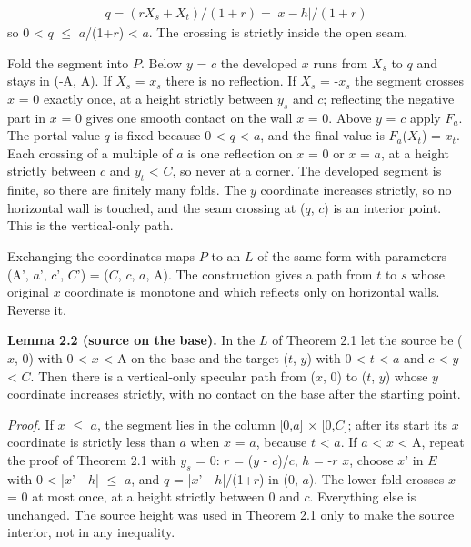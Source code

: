 \documentclass[11pt]{article}
\begin{document}
\begin{gather*}
q = (r X_{s} + X_{t})/(1 + r) = |x - h|/(1 + r)
\end{gather*}
so 0 < \(q\) \(\le\) \(a\)/(1+\(r\)) < \(a\). The crossing is strictly inside the open seam.

Fold the segment into \(P\). Below \(y\) = \(c\) the developed \(x\) runs from \(X_{s}\) to \(q\) and stays in (-A, A). If \(X_{s}\) = \(x_{s}\) there is no reflection. If \(X_{s}\) = -\(x_{s}\) the segment crosses \(x\) = 0 exactly once, at a height strictly between \(y_{s}\) and \(c\); reflecting the negative part in \(x\) = 0 gives one smooth contact on the wall \(x\) = 0. Above \(y\) = \(c\) apply \(F_{a}\). The portal value \(q\) is fixed because 0 < \(q\) < \(a\), and the final value is \(F_{a}\)(\(X_{t}\)) = \(x_{t}\). Each crossing of a multiple of \(a\) is one reflection on \(x\) = 0 or \(x\) = \(a\), at a height strictly between \(c\) and \(y_{t}\) < \(C\), so never at a corner. The developed segment is finite, so there are finitely many folds. The \(y\) coordinate increases strictly, so no horizontal wall is touched, and the seam crossing at (\(q\), \(c\)) is an interior point. This is the vertical-only path.

Exchanging the coordinates maps \(P\) to an \(L\) of the same form with parameters (A', \(a\)', \(c\)', \(C\)') = (\(C\), \(c\), \(a\), A). The construction gives a path from \(t\) to \(s\) whose original \(x\) coordinate is monotone and which reflects only on horizontal walls. Reverse it.

\textbf{Lemma 2.2 (source on the base).} In the \(L\) of Theorem 2.1 let the source be (\(x\), 0) with 0 < \(x\) < A on the base and the target (\(t\), \(y\)) with 0 < \(t\) < \(a\) and \(c\) < \(y\) < \(C\). Then there is a vertical-only specular path from (\(x\), 0) to (\(t\), \(y\)) whose \(y\) coordinate increases strictly, with no contact on the base after the starting point.

\emph{Proof.} If \(x\) \(\le\) \(a\), the segment lies in the column [0,\(a\)] \(\times\) [0,\(C\)]; after its start its \(x\) coordinate is strictly less than \(a\) when \(x\) = \(a\), because \(t\) < \(a\). If \(a\) < \(x\) < A, repeat the proof of Theorem 2.1 with \(y_{s}\) = 0: \(r\) = (\(y\) - \(c\))/\(c\), \(h\) = -\(r\) \(x\), choose \(x\)' in \(E\) with 0 < |\(x\)' - \(h\)| \(\le\) \(a\), and \(q\) = |\(x\)' - \(h\)|/(1+\(r\)) in (0, \(a\)). The lower fold crosses \(x\) = 0 at most once, at a height strictly between 0 and \(c\). Everything else is unchanged. The source height was used in Theorem 2.1 only to make the source interior, not in any inequality.
\end{document}
